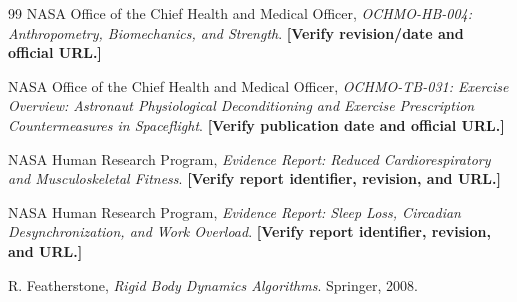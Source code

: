 \documentclass[11pt,a4paper]{article}
\newcommand{\placeholder}[1]{{\color{red}\bfseries[#1]}}
\begin{document}
\begin{thebibliography}{99}
NASA Office of the Chief Health and Medical Officer,
\emph{OCHMO-HB-004: Anthropometry, Biomechanics, and Strength}.
\placeholder{Verify revision/date and official URL.}

NASA Office of the Chief Health and Medical Officer,
\emph{OCHMO-TB-031: Exercise Overview: Astronaut Physiological Deconditioning and Exercise Prescription Countermeasures in Spaceflight}.
\placeholder{Verify publication date and official URL.}

NASA Human Research Program,
\emph{Evidence Report: Reduced Cardiorespiratory and Musculoskeletal Fitness}.
\placeholder{Verify report identifier, revision, and URL.}

NASA Human Research Program,
\emph{Evidence Report: Sleep Loss, Circadian Desynchronization, and Work Overload}.
\placeholder{Verify report identifier, revision, and URL.}

R. Featherstone,
\emph{Rigid Body Dynamics Algorithms}.
Springer, 2008.

\end{thebibliography}
\end{document}
